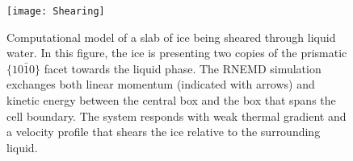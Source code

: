 \documentclass[aps,jcp,preprint,showpacs,superscriptaddress,groupedaddress]{revtex4}  %
\begin{document}





\newpage
\begin{figure}
\texttt{[image: Shearing]}
\caption{\label{fig:Shearing} Computational model of a slab of ice
  being sheared through liquid water.  In this figure, the ice is
  presenting two copies of the prismatic $\{10\bar{1}0\}$ facet
  towards the liquid phase.  The RNEMD simulation exchanges both
  linear momentum (indicated with arrows) and kinetic energy between
  the central box and the box that spans the cell boundary.  The
  system responds with weak thermal gradient and a velocity profile
  that shears the ice relative to the surrounding liquid.}
\end{figure}
\end{document}
